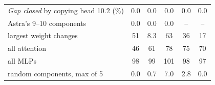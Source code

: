 \begin{table}[htbp]
\begin{tabularx}{\textwidth}{@{}>{\raggedright\arraybackslash}Xccccc@{}}
\emph{Gap closed} by copying head 10.2 (\%) & 0.0 & 0.0 & 0.0 & 0.0 & 0.0\\
\quad Astra's 9--10 components & 0.0 & 0.0 & 0.0 & -- & --\\
\quad 10 largest weight changes & 51 & 8.3 & 63 & 36 & 17\\
\quad all attention & 46 & 61 & 78 & 75 & 70\\
\quad all MLPs & 98 & 99 & 101 & 98 & 97\\
\quad 10 random components, max of 5 & 0.0 & 0.7 & 7.0 & 2.8 & 0.0\\
\bottomrule
\end{tabularx}
\end{table}

